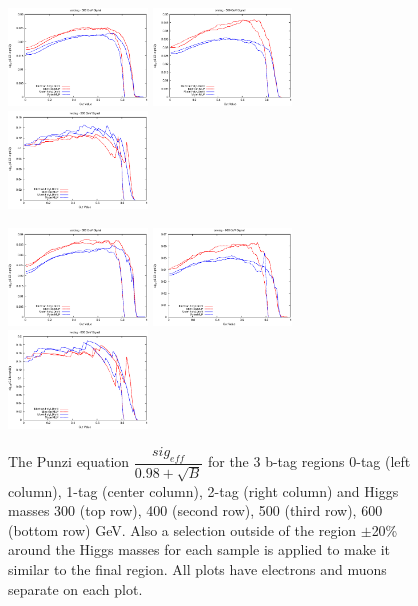 \begin{figure}[htb!]
\begin{center}
{}
\centerline{
  \includegraphics[width=0.33\textwidth]{Optimization/5ang/zero_500.eps}
\includegraphics[width=0.33\textwidth]{Optimization/5ang/one_500.eps}
\includegraphics[width=0.33\textwidth]{Optimization/5ang/two_500.eps}
}
\centerline{
  \includegraphics[width=0.33\textwidth]{Optimization/5ang/zero_600.eps}
 \includegraphics[width=0.33\textwidth]{Optimization/5ang/one_600.eps}
 \includegraphics[width=0.33\textwidth]{Optimization/5ang/two_600.eps}
}
\caption{
The Punzi equation $\dfrac{sig_{eff}}{0.98 + \sqrt{B}}$ for the 3 b-tag regions 0-tag (left column), 1-tag (center column), 2-tag (right column) and Higgs masses 300 (top row), 400 (second row), 500 (third row), 600 (bottom row) GeV.  Also a selection outside of the region $\pm$20\% around the Higgs masses for each sample is applied to make it similar to the final region. All plots have electrons and muons separate on each plot.
}
\label{fig:Punzi_tags}
\end{center}
\end{figure}




